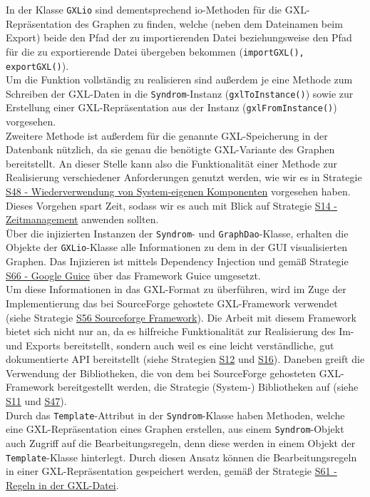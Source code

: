 \documentclass[enabledeprecatedfontcommands,fontsize=11pt,paper=a4,twoside]{scrartcl}
\newcounter{one}
\begin{document}
In der Klasse \texttt{GXLio} sind dementsprechend io-Methoden für die GXL-Repräsentation des Graphen zu finden, welche (neben dem Dateinamen beim Export) beide den Pfad der zu importierenden Datei beziehungsweise den Pfad für die zu exportierende Datei übergeben bekommen (\texttt{importGXL(), exportGXL()}). \\
Um die Funktion vollständig zu realisieren sind außerdem je eine Methode zum Schreiben der GXL-Daten in die \texttt{Syndrom}-Instanz (\texttt{gxlToInstance()}) sowie zur Erstellung einer GXL-Repräsentation aus der Instanz (\texttt{gxlFromInstance()}) vorgesehen. \\
Zweitere Methode ist außerdem für die genannte GXL-Speicherung in der Datenbank nützlich, da sie genau die benötigte GXL-Variante des Graphen bereitstellt. An dieser Stelle kann also die Funktionalität einer Methode zur Realisierung verschiedener Anforderungen genutzt werden, wie wir es in Strategie \hyperlink{aaab}{S48 - Wiederverwendung von System-eigenen Komponenten} vorgesehen haben. Dieses Vorgehen spart Zeit, sodass wir es auch mit Blick auf Strategie \hyperlink{zeitmanagement}{S14 - Zeitmanagement} anwenden sollten. \\ 

Über die injizierten Instanzen der \texttt{Syndrom}- und \texttt{GraphDao}-Klasse, erhalten die Objekte der \texttt{GXLio}-Klasse alle Informationen zu dem in der GUI visualisierten Graphen. Das Injizieren ist mittels Dependency Injection und gemäß Strategie \hyperlink{abcd}{S66 - Google Guice} über das Framework Guice umgesetzt. \\
Um diese Informationen in das GXL-Format zu überführen, wird im Zuge der Implementierung das bei SourceForge gehostete GXL-Framework verwendet (siehe Strategie \hyperlink{ttt}{S56 Sourceforge Framework}). Die Arbeit mit diesem Framework bietet sich nicht nur an, da es hilfreiche Funktionalität zur Realisierung des Im- und Exports bereitstellt, sondern auch weil es eine leicht verständliche, gut dokumentierte API bereitstellt (siehe Strategien \hyperlink{aaaf}{S12} und \hyperlink{ddd}{S16}). Daneben greift die Verwendung der Bibliotheken, die von dem bei SourceForge gehosteten GXL-Framework bereitgestellt werden, die Strategie (System-) Bibliotheken auf (siehe \hyperlink{ccc}{S11} und \hyperlink{qqq}{S47}). \\

Durch das \texttt{Template}-Attribut in der \texttt{Syndrom}-Klasse haben Methoden, welche eine GXL-Repräsentation eines Graphen erstellen, aus einem \texttt{Syndrom}-Objekt auch Zugriff auf die Bearbeitungsregeln, denn diese werden in einem Objekt der \texttt{Template}-Klasse hinterlegt.
Durch diesen Ansatz können die Bearbeitungsregeln in einer GXL-Repräsentation gespeichert werden, gemäß der Strategie \hyperlink{vvv}{S61 - Regeln in der GXL-Datei}. \\ 
\end{document}
